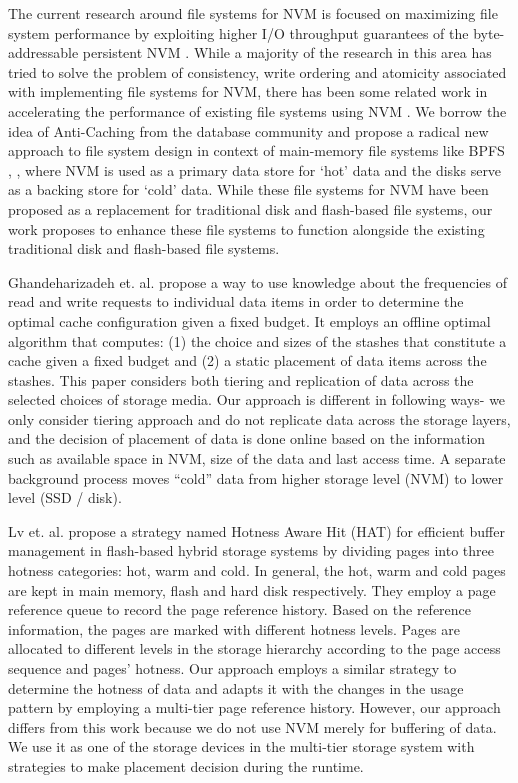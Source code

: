\documentclass[letterpaper, 10 pt, conference]{ieeeconf}  %
\begin{document}
The current research around file systems for NVM is focused on maximizing file system performance by exploiting higher I/O throughput guarantees of the byte-addressable persistent NVM \cite{c10,c8,c3,c5}. While a majority of the research in this area has tried to solve the problem of consistency, write ordering and atomicity associated with implementing file systems for NVM, there has been some related work in accelerating the performance of existing file systems using NVM \cite{c11, c12}. We borrow the idea of Anti-Caching \cite{c13} from the database community and propose a radical new approach to file system design in context of main-memory file systems like BPFS \cite{c10}, \cite{c8}, where NVM is used as a primary data store for ‘hot’ data and the disks serve as a backing store for ‘cold’ data. While these file systems for NVM have been proposed as a replacement for traditional disk and flash-based file systems, our work proposes to enhance these file systems to function alongside the existing traditional disk and flash-based file systems. 

Ghandeharizadeh et. al. \cite{c2} propose a way to use knowledge about the frequencies of read and write requests to individual data items in order to determine the optimal cache configuration given a fixed budget. It employs an offline optimal algorithm that computes: (1) the choice and sizes of the stashes that constitute a cache given a fixed budget and (2) a static placement of data items across the stashes. This paper considers both tiering and replication of data across the selected choices of storage media. Our approach is different in following ways- we only consider tiering approach and do not replicate data across the storage layers, and the decision of placement of data is done online based on the information such as available space in NVM, size of the data and last access time. A separate background process moves “cold” data from higher storage level (NVM) to lower level (SSD / disk). 

Lv et. al. \cite{c1} propose a strategy named Hotness Aware Hit (HAT) for efficient buffer management in flash-based hybrid storage systems by dividing pages into three hotness categories: hot, warm and cold. In general, the hot, warm and cold pages are kept in main memory, flash and hard disk respectively. They employ a page reference queue to record the page reference history. Based on the reference information, the pages are marked with different hotness levels. Pages are allocated to different levels in the storage hierarchy according to the page access sequence and pages’ hotness. Our approach employs a similar strategy to determine the hotness of data and adapts it with the changes in the usage pattern by employing a multi-tier page reference history. However, our approach differs from this work because we do not use NVM merely for buffering of data. We use it as one of the storage devices in the multi-tier storage system with strategies to make placement decision during the runtime. 
 
\end{document}
